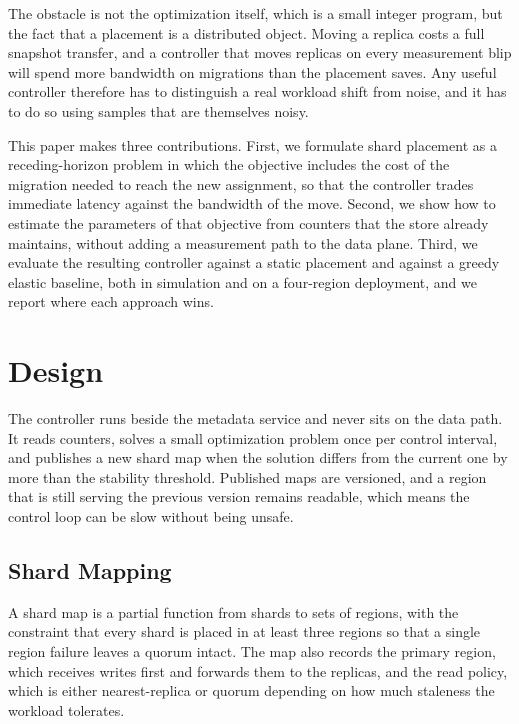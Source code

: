 ﻿\documentclass[10pt,twocolumn,letterpaper]{article}
\begin{document}
The obstacle is not the optimization itself, which is a small integer program, but the
fact that a placement is a distributed object. Moving a replica costs a full snapshot
transfer, and a controller that moves replicas on every measurement blip will spend more
bandwidth on migrations than the placement saves. Any useful controller therefore has to
distinguish a real workload shift from noise, and it has to do so using samples that are
themselves noisy.

This paper makes three contributions. First, we formulate shard placement as a
receding-horizon problem in which the objective includes the cost of the migration needed
to reach the new assignment, so that the controller trades immediate latency against the
bandwidth of the move. Second, we show how to estimate the parameters of that objective
from counters that the store already maintains, without adding a measurement path to the
data plane. Third, we evaluate the resulting controller against a static placement and
against a greedy elastic baseline, both in simulation and on a four-region deployment,
and we report where each approach wins.

\section{Design}
The controller runs beside the metadata service and never sits on the data path. It
reads counters, solves a small optimization problem once per control interval, and
publishes a new shard map when the solution differs from the current one by more than
the stability threshold. Published maps are versioned, and a region that is still
serving the previous version remains readable, which means the control loop can be slow
without being unsafe.

\subsection{Shard Mapping}
A shard map is a partial function from shards to sets of regions, with the constraint
that every shard is placed in at least three regions so that a single region failure
leaves a quorum intact. The map also records the primary region, which receives writes
first and forwards them to the replicas, and the read policy, which is either
nearest-replica or quorum depending on how much staleness the workload tolerates.
\end{document}
